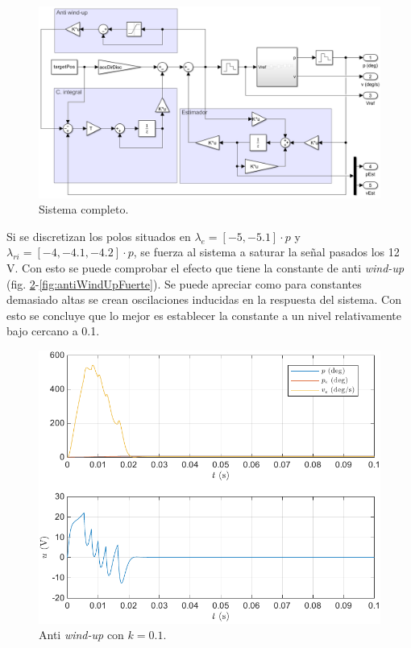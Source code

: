 \documentclass{article}
\begin{document}
\begin{figure}[H]
    \centering
    \includegraphics[width=0.75\linewidth]{img/controladorDisc.png}
    \caption{Sistema completo.}
    \label{fig:controladorDisc}
\end{figure}

Si se discretizan los polos situados en $\lambda_e = \left[ -5, -5.1 \right]\cdot p$ y $\lambda_{ri} = \left[ -4, -4.1, -4.2 \right]\cdot p$, se fuerza al sistema a saturar la señal pasados los 12 V. Con esto se puede comprobar el efecto que tiene la constante de anti \textit{wind-up} (fig. \ref{fig:antiWindUpFlojo}-\ref{fig:antiWindUpFuerte}). Se puede apreciar como para constantes demasiado altas se crean oscilaciones inducidas en la respuesta del sistema. Con esto se concluye que lo mejor es establecer la constante a un nivel relativamente bajo cercano a 0.1.

\begin{figure}[H]
    \centering
    \includegraphics[width=0.75\linewidth]{img/antiWindUpFlojo.pdf}
    \caption{Anti \textit{wind-up} con $k = 0.1$.}
    \label{fig:antiWindUpFlojo}
\end{figure}
\end{document}

